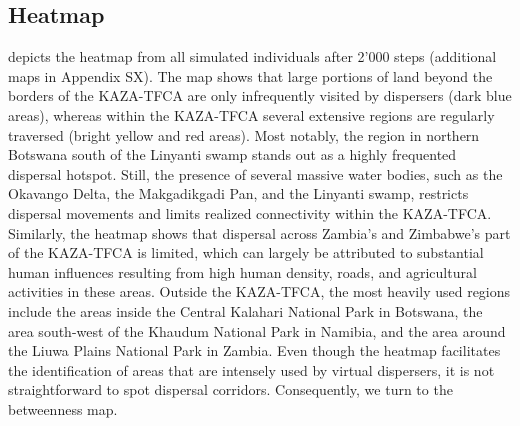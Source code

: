 \documentclass[abstract=on,10pt,a4paper,bibliography=totocnumbered]{article}
\begin{document}
\subsection{Heatmap}
 depicts the heatmap from all simulated individuals after 2'000
steps (additional maps in Appendix SX). The map shows that large portions of
land beyond the borders of the KAZA-TFCA are only infrequently visited by
dispersers (dark blue areas), whereas within the KAZA-TFCA several extensive
regions are regularly traversed (bright yellow and red areas). Most notably, the
region in northern Botswana south of the Linyanti swamp stands out as a highly
frequented dispersal hotspot. Still, the presence of several massive water
bodies, such as the Okavango Delta, the Makgadikgadi Pan, and the Linyanti
swamp, restricts dispersal movements and limits realized connectivity within the
KAZA-TFCA. Similarly, the heatmap shows that dispersal across Zambia's and
Zimbabwe's part of the KAZA-TFCA is limited, which can largely be attributed to
substantial human influences resulting from high human density, roads, and
agricultural activities in these areas. Outside the KAZA-TFCA, the most heavily
used regions include the areas inside the Central Kalahari National Park in
Botswana, the area south-west of the Khaudum National Park in Namibia, and the
area around the Liuwa Plains National Park in Zambia. Even though the heatmap
facilitates the identification of areas that are intensely used by virtual
dispersers, it is not straightforward to spot dispersal corridors.
Consequently, we turn to the betweenness map.
\end{document}
